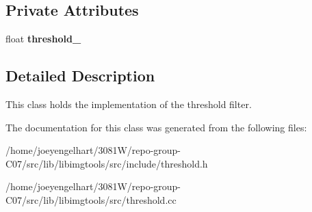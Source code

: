\subsection*{Private Attributes}
\begin{DoxyCompactItemize}
\item 
float {\bfseries threshold\+\_\+}\hypertarget{classimage__tools_1_1Threshold_a4a644f263eeb80d5afe1deb04c20a81d}{}\label{classimage__tools_1_1Threshold_a4a644f263eeb80d5afe1deb04c20a81d}

\end{DoxyCompactItemize}


\subsection{Detailed Description}
This class holds the implementation of the threshold filter. 

The documentation for this class was generated from the following files\+:\begin{DoxyCompactItemize}
\item 
/home/joeyengelhart/3081\+W/repo-\/group-\/\+C07/src/lib/libimgtools/src/include/threshold.\+h\item 
/home/joeyengelhart/3081\+W/repo-\/group-\/\+C07/src/lib/libimgtools/src/threshold.\+cc\end{DoxyCompactItemize}
